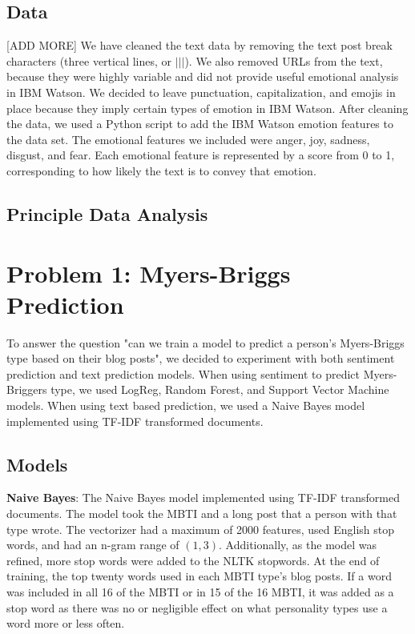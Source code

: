 \documentclass{article}
\begin{document}
\subsection{Data}
[ADD MORE] We have cleaned the text data by removing the text post break characters (three vertical lines, or $|||$). We also removed URLs from the text, because they were highly variable and did not provide useful emotional analysis in IBM Watson. We decided to leave punctuation, capitalization, and emojis in place because they imply certain types of emotion in IBM Watson. After cleaning the data, we used a Python script to add the IBM Watson emotion features to the data set. The emotional features we included were anger, joy, sadness, disgust, and fear. Each emotional feature is represented by a score from 0 to 1, corresponding to how likely the text is to convey that emotion. 

\subsection{Principle Data Analysis}

\section{Problem 1: Myers-Briggs Prediction}
To answer the question "can we train a model to predict a person's Myers-Briggs type based on their blog posts", we decided to experiment with both sentiment prediction and text prediction models. When using sentiment to predict Myers-Briggers type, we used LogReg, Random Forest, and Support Vector Machine models. When using text based prediction, we used a Naive Bayes model implemented using TF-IDF transformed documents. 
\subsection{Models}
\textbf{Naive Bayes}: The Naive Bayes model implemented using TF-IDF transformed documents. The model took the MBTI and a long post that a person with that type wrote. The vectorizer had a maximum of 2000 features, used English stop words, and had an n-gram range of $(1,3)$. Additionally, as the model was refined, more stop words were added to the NLTK stopwords. At the end of training, the top twenty words used in each MBTI type's blog posts. If a word was included in all 16 of the MBTI or in 15 of the 16 MBTI, it was added as a stop word as there was no or negligible effect on what personality types use a word more or less often.  
\end{document}

